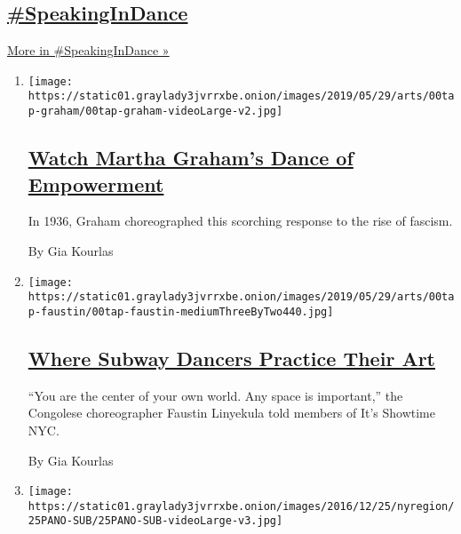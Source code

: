 \hypertarget{speakingindance}{%
\subsection{\texorpdfstring{\href{/column/speakingindance}{\#SpeakingInDance}}{\#SpeakingInDance}}\label{speakingindance}}

\href{/column/speakingindance}{More in \#SpeakingInDance »}

\begin{enumerate}
\def\labelenumi{\arabic{enumi}.}
\item
  \texttt{[image: https://static01.graylady3jvrrxbe.onion/images/2019/05/29/arts/00tap-graham/00tap-graham-videoLarge-v2.jpg]}

  \hypertarget{watch-martha-grahams-dance-of-empowerment}{%
  \subsection{\texorpdfstring{\href{/interactive/2019/05/30/arts/dance/speaking-in-dance-martha-graham.html}{Watch
  Martha Graham's Dance of
  Empowerment}}{Watch Martha Graham's Dance of Empowerment}}\label{watch-martha-grahams-dance-of-empowerment}}

  In 1936, Graham choreographed this scorching response to the rise of
  fascism.

  By Gia Kourlas
\item
  \texttt{[image: https://static01.graylady3jvrrxbe.onion/images/2019/05/29/arts/00tap-faustin/00tap-faustin-mediumThreeByTwo440.jpg]}

  \hypertarget{where-subway-dancers-practice-their-art}{%
  \subsection{\texorpdfstring{\href{/interactive/2019/05/30/arts/dance/speaking-in-dance-showtime-faustin.html}{Where
  Subway Dancers Practice Their
  Art}}{Where Subway Dancers Practice Their Art}}\label{where-subway-dancers-practice-their-art}}

  ``You are the center of your own world. Any space is important,'' the
  Congolese choreographer Faustin Linyekula told members of It's
  Showtime NYC.

  By Gia Kourlas
\item
  \texttt{[image: https://static01.graylady3jvrrxbe.onion/images/2016/12/25/nyregion/25PANO-SUB/25PANO-SUB-videoLarge-v3.jpg]}

  \hypertarget{how-the-rockettes-fall-like-dominoes}{%
}
\end{enumerate}
